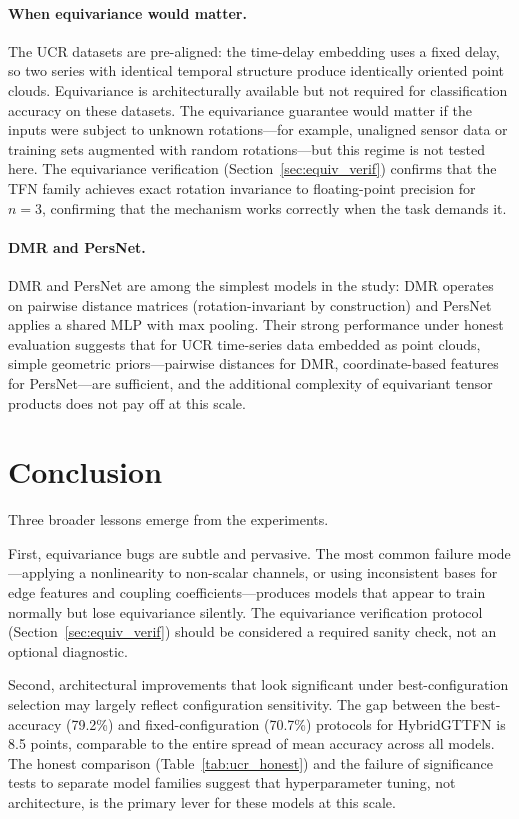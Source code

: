 \documentclass[a4paper,11pt]{article}
\begin{document}
\paragraph{When equivariance would matter.}
The UCR datasets are pre-aligned: the time-delay embedding uses a fixed delay, so two series with identical temporal structure produce identically oriented point clouds.
Equivariance is architecturally available but not required for classification accuracy on these datasets.
The equivariance guarantee would matter if the inputs were subject to unknown rotations---for example, unaligned sensor data or training sets augmented with random rotations---but this regime is not tested here.
The equivariance verification (Section~\ref{sec:equiv_verif}) confirms that the TFN family achieves exact rotation invariance to floating-point precision for $n\!=\!3$, confirming that the mechanism works correctly when the task demands it.

\paragraph{DMR and PersNet.}
DMR and PersNet are among the simplest models in the study: DMR operates on pairwise distance matrices (rotation-invariant by construction) and PersNet applies a shared MLP with max pooling.
Their strong performance under honest evaluation suggests that for UCR time-series data embedded as point clouds, simple geometric priors---pairwise distances for DMR, coordinate-based features for PersNet---are sufficient, and the additional complexity of equivariant tensor products does not pay off at this scale.

\section{Conclusion}

Three broader lessons emerge from the experiments.

First, equivariance bugs are subtle and pervasive.
The most common failure mode---applying a nonlinearity to non-scalar channels, or using inconsistent bases for edge features and coupling coefficients---produces models that appear to train normally but lose equivariance silently.
The equivariance verification protocol (Section~\ref{sec:equiv_verif}) should be considered a required sanity check, not an optional diagnostic.

Second, architectural improvements that look significant under best-configuration selection may largely reflect configuration sensitivity.
The gap between the best-accuracy (79.2\%) and fixed-configuration (70.7\%) protocols for HybridGTTFN is 8.5 points, comparable to the entire spread of mean accuracy across all models.
The honest comparison (Table~\ref{tab:ucr_honest}) and the failure of significance tests to separate model families suggest that hyperparameter tuning, not architecture, is the primary lever for these models at this scale.
\end{document}
